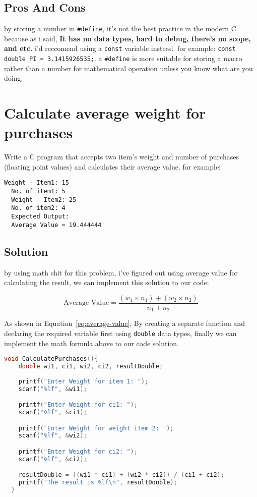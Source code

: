 \documentclass{article}
\begin{document}
  \subsection{Pros And Cons}
  
  by storing a number in \texttt{\#define}, it's not the best practice in the modern C. because as i said, \textbf{It has no data types, hard to debug, there's no scope, and etc.} 
  i'd reccomend using a \texttt{const} variable instead. for example: \texttt{const double PI = 3.1415926535;}. a \texttt{\#define} is more suitable for storing a macro rather than a number for mathematical operation unless you know what are you doing.

  \vfill\null
  
  \section{Calculate average weight for purchases} 
  
  Write a C program that accepts two item's weight and number of purchases (floating point values) and calculates their average value.
  for example: 
  
  \begin{lstlisting}[style=plainstyle]
  Weight - Item1: 15
  No. of item1: 5
  Weight - Item2: 25
  No. of item2: 4
  Expected Output:
  Average Value = 19.444444
  \end{lstlisting}
  
  \subsection{Solution}
  
  by using math shit for this problem, i've figured out using average value for calculating the result, we can implement this solution to our code:
  
  \begin{equation}
  \text{Average Value} = \frac{(w_1 \times n_1) + (w_2 \times n_2)}{n_1 + n_2}
  \label{eq:average-value}
  \end{equation}

  \vspace{2pt}
  
  As shown in Equation~\ref{eq:average-value}, By creating a separate function and declaring the required variable first using \texttt{double} data types, finally we can implement the math formula above
  to our code solution.
  \begin{lstlisting}[language=C, caption=Code Solution]
  void CalculatePurchases(){
    double wi1, ci1, wi2, ci2, resultDouble;
    
    printf("Enter Weight for item 1: ");
    scanf("%lf", &wi1);

    printf("Enter Weight for ci1: ");
    scanf("%lf", &ci1);

    printf("Enter Weight for weight item 2: ");
    scanf("%lf", &wi2);

    printf("Enter Weight for ci2: ");
    scanf("%lf", &ci2);

    resultDouble = ((wi1 * ci1) + (wi2 * ci2)) / (ci1 + ci2);
    printf("The result is %lf\n", resultDouble);
  } 
  \end{lstlisting}
  
\end{document}
